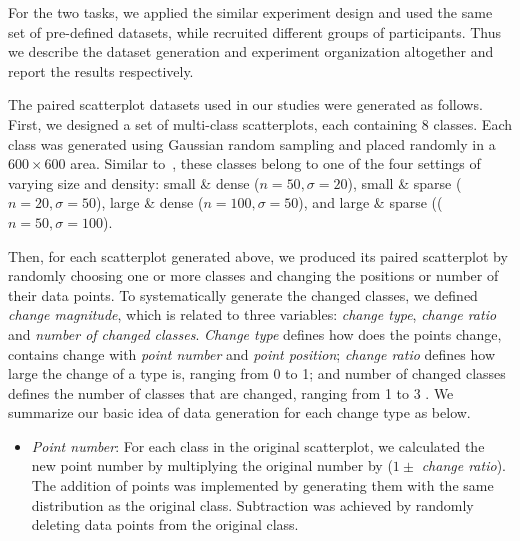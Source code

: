 {For the two tasks, we applied the similar experiment design and used the same set of pre-defined datasets, while recruited different groups of participants. Thus we describe the dataset generation and experiment organization altogether and report the results respectively.


\vspace{.3em}
The paired scatterplot datasets used in our studies were generated as follows.
First, we designed a set of multi-class scatterplots, each containing $8$ classes. Each class was generated using Gaussian random sampling and placed randomly in a $600 \times 600$ area.
Similar to~\cite{Lu21}, these classes belong to one of the four settings of varying size and density: small \& dense ($n=50, \sigma=20$), small \& sparse ($n=20, \sigma=50$),  large \& dense ($n=100, \sigma=50$), and large \& sparse (($n=50, \sigma=100$).

Then, for each scatterplot generated above, we produced its paired scatterplot by randomly choosing one or more classes and changing the positions or number of their data points.
To systematically generate the changed classes, we defined \emph{change magnitude}, which is related to three variables: \emph{change type}, \emph{change ratio} and \emph{number of changed classes}.
\emph{Change type} defines how does the points change, contains change with \emph{point number} and \emph{point position};
\emph{change ratio} defines how large the change of a type is, ranging from 0 to 1; and {number of changed classes} defines the number of classes that are changed, ranging from 1 to 3
. We summarize our basic idea of data generation for each change type as below.
\begin{itemize}

     \item \emph{Point number}: For each class in the original scatterplot,  we calculated the new point number by multiplying the original number by ($1 \pm$ \emph{change ratio}). The addition of points was implemented by generating them with the same distribution as the original class. Subtraction was achieved by randomly deleting data points from the original class.


\end{itemize}}
